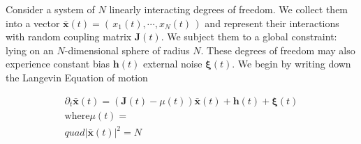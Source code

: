 Consider a system of $N$ linearly interacting degrees of freedom. We collect them into a vector $\mathbf{\bar x}(t) = \left(\,x_1(t),\cdots, x_N(t)\,\right)$ and represent their interactions with random coupling matrix $\mathbf{J}(t)$. We subject them to a global constraint: lying on an $N$-dimensional sphere of radius $N$. These degrees of freedom may also experience constant bias $\mathbf{h}(t)$ external noise $\boldsymbol\xi(t)$. We begin by writing down the Langevin Equation of motion

\begin{align}
\partial_t\mathbf{\bar x}(t) = (\mathbf{J}(t)-\mu(t))\mathbf{\bar x}(t)+\mathbf{h}(t)+\boldsymbol\xi(t) \\
\mathrm{where}\mu(t)=\\quad|\mathbf{\bar x}(t)|^2=N
\end{align}